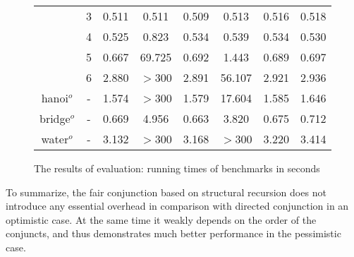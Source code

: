 \begin{figure}[]
\begin{tabular}{ c | c | c | c | c | c | c | c }
                 & 3    & 0.511 &  0.511 & 0.509 & 0.513  & 0.516 & 0.518 \\
                 & 4    & 0.525 &  0.823 & 0.534 & 0.539  & 0.534 & 0.530 \\
                 & 5    & 0.667 & 69.725 & 0.692 & 1.443  & 0.689 & 0.697 \\
                 & 6    & 2.880 & $>$300 & 2.891 & 56.107 & 2.921 & 2.936 \\
    \hline
    hanoi$^o$    & -    & 1.574 & $>$300 & 1.579 & 17.604 & 1.585 & 1.646 \\
    \hline
    bridge$^o$   & -    & 0.669 & 4.956  & 0.663 & 3.820  & 0.675 & 0.712 \\
    \hline
    water$^o$    & -    & 3.132 & $>$300 & 3.168 & $>$300 & 3.220 & 3.414

  \end{tabular}
  \caption{The results of evaluation: running times of benchmarks in seconds}
  \label{fair:evaluation-table}
\end{figure}

To summarize, the fair conjunction based on structural recursion does not introduce any essential overhead in comparison with directed conjunction in an optimistic case. At the same time it
weakly depends on the order of the conjuncts, and thus demonstrates much better performance in the pessimistic case.